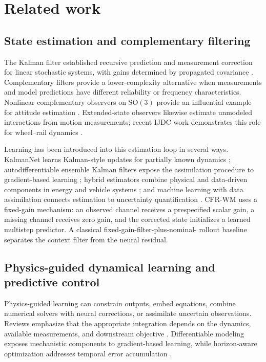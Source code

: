 \section{Related work}

\subsection{State estimation and complementary filtering}

The Kalman filter established recursive prediction and measurement correction
for linear stochastic systems, with gains determined by propagated covariance
\cite{kalman1960_filtering}. Complementary filters provide a lower-complexity
alternative when measurements and model predictions have different reliability
or frequency characteristics. Nonlinear complementary observers on
$\mathrm{SO}(3)$ provide an influential example for attitude estimation
\cite{mahony2008_complementary}. Extended-state observers likewise estimate
unmodeled interactions from motion measurements; recent IJDC work demonstrates
this role for wheel--rail dynamics \cite{zhao2023_wheel_rail_observer}.

Learning has been introduced into this estimation loop in several ways.
KalmanNet learns Kalman-style updates for partially known dynamics
\cite{revach2022_kalmannet}; autodifferentiable ensemble Kalman filters expose
the assimilation procedure to gradient-based learning
\cite{chen2022_autodifferentiable_enkf}; hybrid estimators combine physical and data-driven
components in energy and vehicle systems
\cite{chen2022_hybrid_physics_data_driven_online,chen2023_hybrid_physics_and_data_driven};
and machine learning with data assimilation connects estimation to uncertainty
quantification \cite{cheng2023_machine_learning_with_data_assimilation}. CFR-WM
uses a fixed-gain mechanism: an observed channel receives a prespecified scalar
gain, a missing channel receives zero gain, and the corrected state initializes
a learned multistep predictor. A classical fixed-gain-filter-plus-nominal-
rollout baseline separates the context filter from the neural residual.

\subsection{Physics-guided dynamical learning and predictive control}

Physics-guided learning can constrain outputs, embed equations, combine
numerical solvers with neural corrections, or assimilate uncertain
observations. Reviews emphasize that the appropriate integration depends on the
dynamics, available measurements, and downstream objective
\cite{cuomo2022_scientific_machine_learning_through_physics,bradley2022_perspectives_on_the_integration_between,yu2024_learning_dynamical_systems_from_data}.
Differentiable modeling exposes mechanistic components to gradient-based
learning, while horizon-aware optimization addresses temporal error
accumulation
\cite{shen2023_differentiable_modelling_to_unify_machine,wang2024_respecting_causality_for_training_physics,list2022_learned_turbulence_modelling_with_differentiable}.

